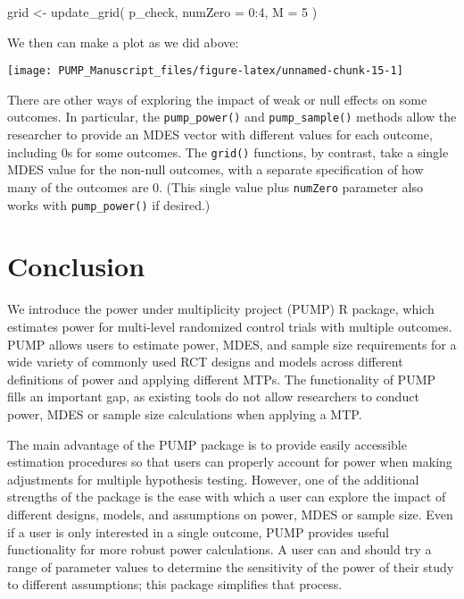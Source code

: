 \documentclass[
]{article}
\newenvironment{Shaded}{\begin{snugshade}}{\end{snugshade}}
\newcommand{\AttributeTok}[1]{\textcolor[rgb]{0.77,0.63,0.00}{#1}}
\newcommand{\DecValTok}[1]{\textcolor[rgb]{0.00,0.00,0.81}{#1}}
\newcommand{\FunctionTok}[1]{\textcolor[rgb]{0.00,0.00,0.00}{#1}}
\newcommand{\NormalTok}[1]{#1}
\newcommand{\OtherTok}[1]{\textcolor[rgb]{0.56,0.35,0.01}{#1}}
\newcommand{\SpecialCharTok}[1]{\textcolor[rgb]{0.00,0.00,0.00}{#1}}
\begin{document}
\begin{Shaded}
\begin{Highlighting}[]
\NormalTok{grid }\OtherTok{\textless{}{-}} \FunctionTok{update\_grid}\NormalTok{( p\_check,}
            \AttributeTok{numZero =} \DecValTok{0}\SpecialCharTok{:}\DecValTok{4}\NormalTok{,}
            \AttributeTok{M =} \DecValTok{5}\NormalTok{ )}
\end{Highlighting}
\end{Shaded}

We then can make a plot as we did above:

\begin{center}\texttt{[image: PUMP\_Manuscript\_files/figure-latex/unnamed-chunk-15-1]} \end{center}

There are other ways of exploring the impact of weak or null effects on
some outcomes. In particular, the \texttt{pump\_power()} and
\texttt{pump\_sample()} methods allow the researcher to provide an MDES
vector with different values for each outcome, including 0s for some
outcomes. The \texttt{grid()} functions, by contrast, take a single MDES
value for the non-null outcomes, with a separate specification of how
many of the outcomes are 0. (This single value plus \texttt{numZero}
parameter also works with \texttt{pump\_power()} if desired.)

\section{Conclusion}
\label{sec:conclusion}

We introduce the power under multiplicity project (PUMP) R package,
which estimates power for multi-level randomized control trials with
multiple outcomes. PUMP allows users to estimate power, MDES, and sample
size requirements for a wide variety of commonly used RCT designs and
models across different definitions of power and applying different
MTPs. The functionality of PUMP fills an important gap, as existing
tools do not allow researchers to conduct power, MDES or sample size
calculations when applying a MTP.

The main advantage of the PUMP package is to provide easily accessible
estimation procedures so that users can properly account for power when
making adjustments for multiple hypothesis testing. However, one of the
additional strengths of the package is the ease with which a user can
explore the impact of different designs, models, and assumptions on
power, MDES or sample size. Even if a user is only interested in a
single outcome, PUMP provides useful functionality for more robust power
calculations. A user can and should try a range of parameter values to
determine the sensitivity of the power of their study to different
assumptions; this package simplifies that process.
\end{document}
